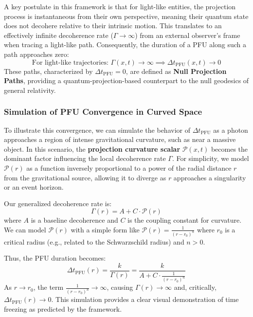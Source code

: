 \documentclass[12pt,a4paper]{article}
\numberwithin{equation}{section}
\begin{document}
A key postulate in this framework is that for light-like entities, the projection process is instantaneous from their own perspective, meaning their quantum state does not decohere relative to their intrinsic motion. This translates to an effectively infinite decoherence rate ($\Gamma \to \infty$) from an external observer's frame when tracing a light-like path. Consequently, the duration of a PFU along such a path approaches zero:
\begin{equation}
\text{For light-like trajectories: } \Gamma(x, t) \to \infty \implies \Delta t_{\text{PFU}}(x, t) \to 0
\label{eq:null_pfu_convergence}
\end{equation}
These paths, characterized by $\Delta t_{\text{PFU}} = 0$, are defined as \textbf{Null Projection Paths}, providing a quantum-projection-based counterpart to the null geodesics of general relativity.

\subsubsection{Simulation of PFU Convergence in Curved Space}
To illustrate this convergence, we can simulate the behavior of $\Delta t_{\text{PFU}}$ as a photon approaches a region of intense gravitational curvature, such as near a massive object. In this scenario, the \textbf{projection curvature scalar} $\mathcal{P}(x, t)$ becomes the dominant factor influencing the local decoherence rate $\Gamma$. For simplicity, we model $\mathcal{P}(r)$ as a function inversely proportional to a power of the radial distance $r$ from the gravitational source, allowing it to diverge as $r$ approaches a singularity or an event horizon.

Our generalized decoherence rate is:
\begin{equation}
\Gamma(r) = A + C \cdot \mathcal{P}(r)
\end{equation}
where $A$ is a baseline decoherence and $C$ is the coupling constant for curvature. We can model $\mathcal{P}(r)$ with a simple form like $\mathcal{P}(r) = \frac{1}{(r - r_0)^n}$ where $r_0$ is a critical radius (e.g., related to the Schwarzschild radius) and $n > 0$.

Thus, the PFU duration becomes:
\begin{equation}
\Delta t_{\text{PFU}}(r) = \frac{k}{\Gamma(r)} = \frac{k}{A + C \cdot \frac{1}{(r - r_0)^n}}
\label{eq:pfu_r_convergence}
\end{equation}
As $r \to r_0$, the term $\frac{1}{(r - r_0)^n} \to \infty$, causing $\Gamma(r) \to \infty$ and, critically, $\Delta t_{\text{PFU}}(r) \to 0$. This simulation provides a clear visual demonstration of time freezing as predicted by the framework.
\end{document}
